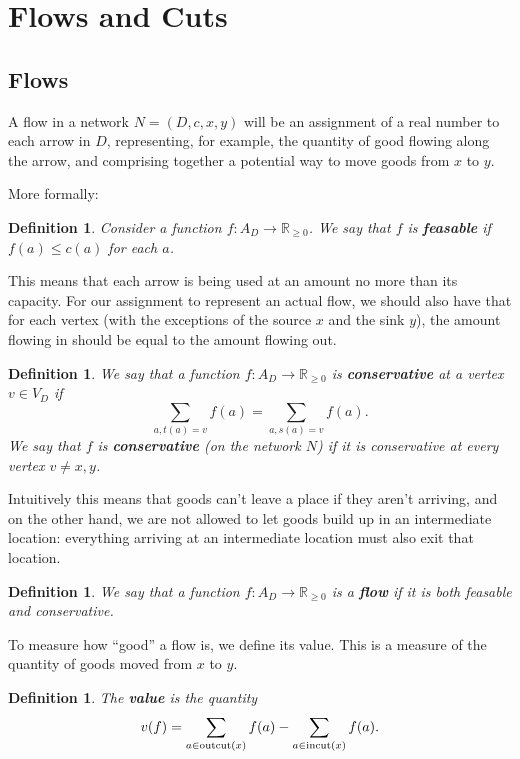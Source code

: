 \documentclass[12pt]{report}
\theoremstyle{plain}
\newtheorem{defn}[thm]{Definition}
\newcommand{\Xb}[1]{\textbf{#1}\index{#1}}
\begin{document}
\section{Flows and Cuts}

\subsection{Flows}

A flow in a network $N = (D, c, x, y)$ will be an assignment of a real
number to each arrow in $D$, representing, for example, the quantity of
good flowing along the arrow, and comprising together a potential way to
move goods from $x$ to $y$. 

More formally: 
\begin{defn}
Consider a function $f: A_D \to \mathbb R_{\geq
0}$. We say that $f$ is \Xb{feasable} if $f(a) \leq c(a)$ for each $a$.
\end{defn}
This means that each arrow is being used at an amount no more than its
capacity. For our assignment to represent an actual flow, we should also
have that for each vertex (with the exceptions of the source $x$ and the
sink $y$), the amount flowing in should be equal to the amount flowing out.

\begin{defn}
We say that a function $f: A_D \to \mathbb R_{\geq 0}$ is \Xb{conservative}
at a vertex $v \in V_D$ if
\[\sum_{a, t(a) = v} f(a) = \sum_{a, s(a) = v} f(a).\]
We say that $f$ is \textbf{conservative} (on the network $N$) if it is
conservative at every vertex $v \neq x, y$.
\end{defn}
Intuitively this means that goods can't leave a place if they aren't
arriving, and on the other hand, we are not allowed to let goods build up
in an intermediate location: everything arriving at an intermediate
location must also exit that location.

\begin{defn} \label{def:flow}
We say that a function $f: A_D \to \mathbb R_{\geq 0}$ is a \Xb{flow} if it
is both feasable and conservative.
\end{defn}

To measure how ``good'' a flow is, we define its value. This is a measure
of the quantity of goods moved from $x$ to $y$.

\begin{defn}
The \textbf{value} is the quantity
\[v(f) = \sum_{a \in \operatorname{outcut}(x)} f(a) - \sum_{a \in \operatorname{incut}(x)} f(a).\]
\end{defn}
\end{document}
